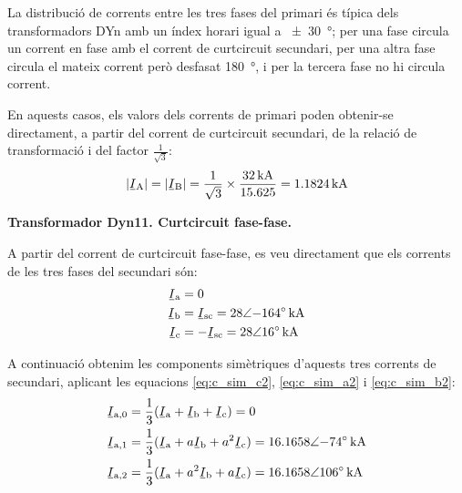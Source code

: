 \begin{exemple}[\CCasimSecTrafo{}]
    La distribució de corrents entre les tres fases del primari és típica dels transformadors DYn amb un índex horari igual a \qty{+-30}{\degree}; per una fase circula un corrent en fase amb el corrent de curtcircuit secundari, per una altra fase circula el mateix corrent però desfasat \qty{180}{\degree}, i per la tercera fase no hi circula corrent.

    En aquests casos, els valors dels corrents de primari poden obtenir-se directament, a partir del corrent de curtcircuit secundari, de la relació de transformació i del factor $\frac{1}{\sqrt{3}}$:
    \[
        |\cmplx{I}\ped{A}| = |\cmplx{I}\ped{B}| = \frac{1}{\sqrt{3}} \times \frac{\qty{32}{kA}}{\num{15,625}} = \qty{1,1824}{kA}
    \]

    \textbf{ Transformador Dyn11. Curtcircuit fase-fase.}

    \begin{center}
       
    \end{center}

    A partir del corrent de curtcircuit fase-fase, es veu directament que els corrents de les tres fases del secundari són:
    \begin{align*}
        \cmplx{I}\ped{a} &= 0  \\
        \cmplx{I}\ped{b} &= \cmplx{I}\ped{sc} = \complexqty{28:-164}{kA}  \\
        \cmplx{I}\ped{c} &= -\cmplx{I}\ped{sc} = \complexqty{28:16}{kA}
    \end{align*}

    A continuació obtenim les components simètriques d'aquests tres corrents de secundari, aplicant les equacions \eqref{eq:c_sim_c2}, \eqref{eq:c_sim_a2} i \eqref{eq:c_sim_b2}:
    \begin{align*}
        \cmplx{I}\ped{a,0} &= \frac{1}{3} (\cmplx{I}\ped{a} + \cmplx{I}\ped{b} +
        \cmplx{I}\ped{c}) = 0 \\
        \cmplx{I}\ped{a,1} &= \frac{1}{3} (\cmplx{I}\ped{a} + a \cmplx{I}\ped{b} +
         a^2 \cmplx{I}\ped{c}) = \complexqty{16,1658:-74}{kA}  \\
        \cmplx{I}\ped{a,2} &= \frac{1}{3} (\cmplx{I}\ped{a} + a^2 \cmplx{I}\ped{b} +
         a \cmplx{I}\ped{c}) = \complexqty{16,1658:106}{kA}
    \end{align*}


\end{exemple}
